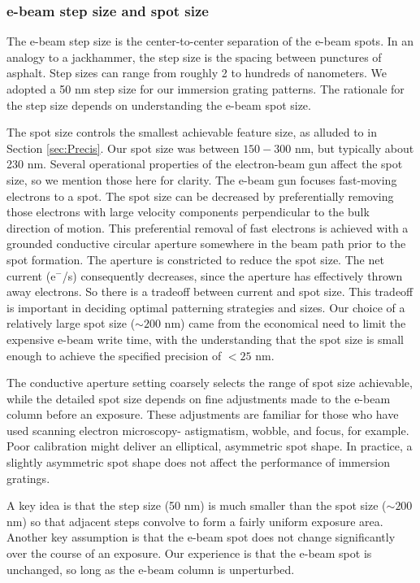 \documentclass[]{spie}  %
\begin{document}
\subsubsection{e-beam step size and spot size}
The e-beam step size is the center-to-center separation of the e-beam spots.  In an analogy to a jackhammer, the step size is the spacing between punctures of asphalt.  Step sizes can range from roughly 2 to hundreds of nanometers.  We adopted a 50 nm step size for our immersion grating patterns.  The rationale for the step size depends on understanding the e-beam spot size.  

The spot size controls the smallest achievable feature size, as alluded to in Section \ref{sec:Precis}.  Our spot size was between $150-300$ nm, but typically about 230 nm.  Several operational properties of the electron-beam gun affect the spot size, so we mention those here for clarity.  The e-beam gun focuses fast-moving electrons to a spot.  The spot size can be decreased by preferentially removing those electrons with large velocity components perpendicular to the bulk direction of motion.  This preferential removal of fast electrons is achieved with a grounded conductive circular aperture somewhere in the beam path prior to the spot formation.  The aperture is constricted to reduce the spot size.  The net current (e$^-$/s) consequently decreases, since the aperture has effectively thrown away electrons.  So there is a tradeoff between current and spot size.  This tradeoff is important in deciding optimal patterning strategies and sizes.  Our choice of a relatively large spot size ($\sim 200$ nm) came from the economical need to limit the expensive e-beam write time, with the understanding that the spot size is small enough to achieve the specified precision of $< 25$ nm.

The conductive aperture setting coarsely selects the range of spot size achievable, while the detailed spot size depends on fine adjustments made to the e-beam column before an exposure.  These adjustments are familiar for those who have used scanning electron microscopy- astigmatism, wobble, and focus, for example.  Poor calibration might deliver an elliptical, asymmetric spot shape.  In practice, a slightly asymmetric spot shape does not affect the performance of immersion gratings.

A key idea is that the step size (50 nm) is much smaller than the spot size ($\sim200$ nm) so that adjacent steps convolve to form a fairly uniform exposure area.  Another key assumption is that the e-beam spot does not change significantly over the course of an exposure.  Our experience is that the e-beam spot is unchanged, so long as the e-beam column is unperturbed.
\end{document}
